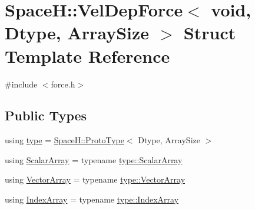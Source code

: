 \hypertarget{struct_space_h_1_1_vel_dep_force_3_01void_00_01_dtype_00_01_array_size_01_4}{}\section{SpaceH\+:\+:Vel\+Dep\+Force$<$ void, Dtype, Array\+Size $>$ Struct Template Reference}
\label{struct_space_h_1_1_vel_dep_force_3_01void_00_01_dtype_00_01_array_size_01_4}


{\ttfamily \#include $<$force.\+h$>$}

\subsection*{Public Types}
\begin{DoxyCompactItemize}
\item 
using \mbox{\hyperlink{struct_space_h_1_1_vel_dep_force_3_01void_00_01_dtype_00_01_array_size_01_4_a8e214ae99bb3d88564c1161b660288b1}{type}} = \mbox{\hyperlink{struct_space_h_1_1_proto_type}{Space\+H\+::\+Proto\+Type}}$<$ Dtype, Array\+Size $>$
\item 
using \mbox{\hyperlink{struct_space_h_1_1_vel_dep_force_3_01void_00_01_dtype_00_01_array_size_01_4_a3fdf665781fcc58227d1451b910aca63}{Scalar\+Array}} = typename \mbox{\hyperlink{struct_space_h_1_1_proto_type_a09ef91dc8a37a044c403f5a833044725}{type\+::\+Scalar\+Array}}
\item 
using \mbox{\hyperlink{struct_space_h_1_1_vel_dep_force_3_01void_00_01_dtype_00_01_array_size_01_4_ab9ab08040353afbaeeade8a442331b8d}{Vector\+Array}} = typename \mbox{\hyperlink{struct_space_h_1_1_proto_type_a622b8e122b33bb4966a02299fb7b82d6}{type\+::\+Vector\+Array}}
\item 
using \mbox{\hyperlink{struct_space_h_1_1_vel_dep_force_3_01void_00_01_dtype_00_01_array_size_01_4_a58bb8d2f9a35c3d16ed717ea3e13427d}{Index\+Array}} = typename \mbox{\hyperlink{struct_space_h_1_1_proto_type_a276a37c81faf08681b57e8082f3f6c1b}{type\+::\+Index\+Array}}
\end{DoxyCompactItemize}
